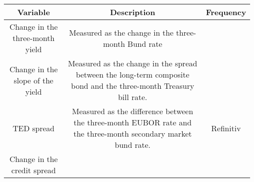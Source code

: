 \documentclass[
  10pt,
]{article}
\begin{document}
\begin{longtable}[]{@{}ccc@{}}
\toprule
\begin{minipage}[b]{0.36\columnwidth}\centering
Variable\strut
\end{minipage} & \begin{minipage}[b]{0.32\columnwidth}\centering
Description\strut
\end{minipage} & \begin{minipage}[b]{0.24\columnwidth}\centering
Frequency\strut
\end{minipage}\tabularnewline
\midrule
\endhead
\begin{minipage}[t]{0.36\columnwidth}\centering
Change in the three-month yield\strut
\end{minipage} & \begin{minipage}[t]{0.32\columnwidth}\centering
Measured as the change in the three-month Bund rate\strut
\end{minipage} & \begin{minipage}[t]{0.24\columnwidth}\centering
\strut
\end{minipage}\tabularnewline
\begin{minipage}[t]{0.36\columnwidth}\centering
Change in the slope of the yield\strut
\end{minipage} & \begin{minipage}[t]{0.32\columnwidth}\centering
Measured as the change in the spread between the long-term composite
bond and the three-month Treasury bill rate.\strut
\end{minipage} & \begin{minipage}[t]{0.24\columnwidth}\centering
\strut
\end{minipage}\tabularnewline
\begin{minipage}[t]{0.36\columnwidth}\centering
TED spread\strut
\end{minipage} & \begin{minipage}[t]{0.32\columnwidth}\centering
Measured as the difference between the three-month EUBOR rate and the
three-month secondary market bund rate.\strut
\end{minipage} & \begin{minipage}[t]{0.24\columnwidth}\centering
Refinitiv\strut
\end{minipage}\tabularnewline
\begin{minipage}[t]{0.36\columnwidth}\centering
Change in the credit spread\strut
\end{minipage} & \begin{minipage}[t]{0.32\columnwidth}\centering

\end{minipage}
\end{longtable}
\end{document}
